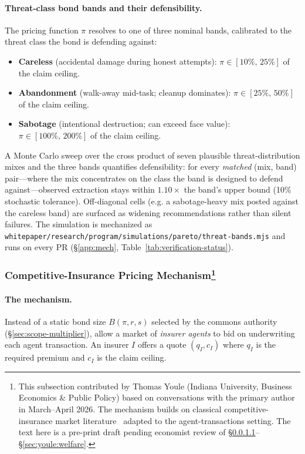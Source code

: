 \documentclass[11pt,a4paper]{article}
\theoremstyle{definition}
\theoremstyle{remark}
\begin{document}
\paragraph{Threat-class bond bands and their defensibility.}\label{sec:pricing:defensibility}
The pricing function $\pi$ resolves to one of three nominal bands, calibrated to the threat class the bond is defending against:
\begin{itemize}[nosep]
  \item \textbf{Careless} (accidental damage during honest attempts): $\pi \in [10\%,\,25\%]$ of the claim ceiling.
  \item \textbf{Abandonment} (walk-away mid-task; cleanup dominates): $\pi \in [25\%,\,50\%]$ of the claim ceiling.
  \item \textbf{Sabotage} (intentional destruction; can exceed face value): $\pi \in [100\%,\,200\%]$ of the claim ceiling.
\end{itemize}
A Monte Carlo sweep over the cross product of seven plausible threat-distribution mixes and the three bands quantifies defensibility: for every \emph{matched} (mix, band) pair---where the mix concentrates on the class the band is designed to defend against---observed extraction stays within $1.10\times$ the band's upper bound (10\% stochastic tolerance). Off-diagonal cells (e.g. a sabotage-heavy mix posted against the careless band) are surfaced as widening recommendations rather than silent failures. The simulation is mechanized as \texttt{whitepaper/research/program/simulations/pareto/threat-bands.mjs} and runs on every PR (\S\ref{app:mech}, Table~\ref{tab:verification-status}).

\subsubsection{Competitive-Insurance Pricing Mechanism\protect\footnote{This subsection contributed by Thomas Youle (Indiana University, Business Economics \& Public Policy) based on conversations with the primary author in March--April 2026. The mechanism builds on classical competitive-insurance market literature~\cite{rothschildstiglitz1976,wilson1977insurance} adapted to the agent-transactions setting. The text here is a pre-print draft pending economist review of \S\ref{sec:youle:mechanism}--\S\ref{sec:youle:welfare}.}}\label{sec:youle}

\paragraph{The mechanism.}\label{sec:youle:mechanism}
Instead of a static bond size $B(\pi, r, s)$ selected by the commons authority (\S\ref{sec:scope-multiplier}), allow a market of \emph{insurer agents} to bid on underwriting each agent transaction. An insurer $I$ offers a quote $(q_I, c_I)$ where $q_I$ is the required premium and $c_I$ is the claim ceiling.
\end{document}
